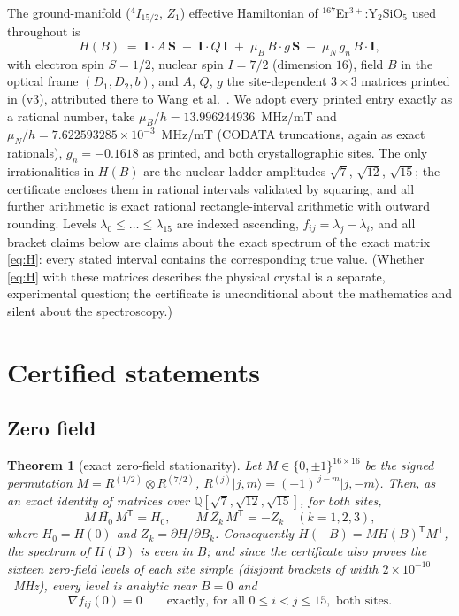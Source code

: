 \documentclass[11pt]{amsart}
\theoremstyle{plain}
\newtheorem{theorem}{Theorem}[section]
\theoremstyle{definition}
\theoremstyle{remark}
\begin{document}
The ground-manifold ($^{4}I_{15/2}$, $Z_1$) effective Hamiltonian of
$^{167}$Er$^{3+}$:Y$_2$SiO$_5$ used throughout \cite{Matsuura} is
\begin{equation}\label{eq:H}
H(B) \;=\; \mathbf I\cdot A\,\mathbf S \;+\; \mathbf I\cdot Q\,\mathbf I
\;+\; \mu_B\, B\cdot g\,\mathbf S \;-\; \mu_N\, g_n\, B\cdot \mathbf I ,
\end{equation}
with electron spin $S=1/2$, nuclear spin $I=7/2$ (dimension $16$), field $B$ in
the optical frame $(D_1,D_2,b)$, and $A$, $Q$, $g$ the site-dependent
$3\times3$ matrices printed in \cite[App.~B]{Matsuura} (v3), attributed there
to Wang et al.\ \cite{Wang2023}.  We adopt every printed entry exactly as a
rational number, take $\mu_B/h=13.996244936$~MHz/mT and
$\mu_N/h=7.622593285\times10^{-3}$~MHz/mT (CODATA truncations, again as exact
rationals), $g_n=-0.1618$ as printed, and both crystallographic sites.  The
only irrationalities in $H(B)$ are the nuclear ladder amplitudes $\sqrt7$,
$\sqrt{12}$, $\sqrt{15}$; the certificate encloses them in rational intervals
validated by squaring, and all further arithmetic is exact rational
rectangle-interval arithmetic with outward rounding.  Levels
$\lambda_0\le\dots\le\lambda_{15}$ are indexed ascending, $f_{ij}=\lambda_j-
\lambda_i$, and all bracket claims below are claims about the exact spectrum of
the exact matrix \eqref{eq:H}: every stated interval contains the corresponding
true value.  (Whether \eqref{eq:H} with these matrices describes the physical
crystal is a separate, experimental question; the certificate is unconditional
about the mathematics and silent about the spectroscopy.)

\section{Certified statements}\label{sec:results}

\subsection{Zero field}\label{sec:zero}

\begin{theorem}[exact zero-field stationarity]\label{thm:zero}
Let $M\in\{0,\pm1\}^{16\times16}$ be the signed permutation
$M=R^{(1/2)}\otimes R^{(7/2)}$, $R^{(j)}\lvert j,m\rangle=(-1)^{\,j-m}\lvert
j,-m\rangle$.  Then, as an exact identity of matrices over
$\mathbb Q[\sqrt7,\sqrt{12},\sqrt{15}]$, for both sites,
\[
M\,\overline{H_0}\,M^{\mathsf T}=H_0,\qquad
M\,\overline{Z_k}\,M^{\mathsf T}=-Z_k\quad(k=1,2,3),
\]
where $H_0=H(0)$ and $Z_k=\partial H/\partial B_k$.  Consequently
$H(-B)=MH(B)^{\mathsf T}M^{\mathsf T}$, the spectrum of $H(B)$ is even in $B$;
and since the certificate also proves the sixteen zero-field levels of each
site simple (disjoint brackets of width $2\times10^{-10}$~MHz), every level is
analytic near $B=0$ and
\[
\nabla f_{ij}(0)=0 \qquad\text{exactly, for all } 0\le i<j\le15,
\text{ both sites.}
\]
\end{theorem}
\end{document}
